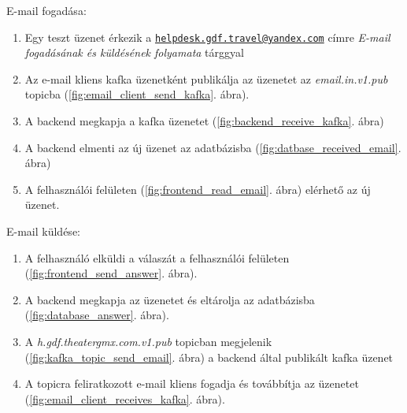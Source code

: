 E-mail fogadása:
\begin{enumerate}
	\item Egy teszt üzenet érkezik a \href{mailto:helpdesk.gdf.travel@yandex.com}{\nolinkurl{helpdesk.gdf.travel@yandex.com}} címre
	\textit{E-mail fogadásának és küldésének folyamata} tárggyal
	\item Az e-mail kliens kafka üzenetként publikálja az üzenetet az \textit{email.in.v1.pub} topicba (\ref{fig:email_client_send_kafka}. ábra).
	\item A backend megkapja a kafka üzenetet (\ref{fig:backend_receive_kafka}. ábra)
	\item A backend elmenti az új üzenet az adatbázisba (\ref{fig:datbase_received_email}. ábra)
	\item A felhasználói felületen (\ref{fig:frontend_read_email}. ábra) elérhető az új üzenet.
\end{enumerate}

\bigskip

E-mail küldése:
\begin{enumerate}
	\item A felhasználó elküldi a válaszát a felhasználói felületen (\ref{fig:frontend_send_answer}. ábra).
	\item A backend megkapja az üzenetet és eltárolja az adatbázisba (\ref{fig:database_answer}. ábra).
	\item A \textit{h.gdf.theater\textunderscore gmx.com.v1.pub} topicban megjelenik  (\ref{fig:kafka_topic_send_email}. ábra) a backend által publikált kafka üzenet
	\item A topicra feliratkozott e-mail kliens fogadja és továbbítja az üzenetet (\ref{fig:email_client_receives_kafka}. ábra).
\end{enumerate}
 

